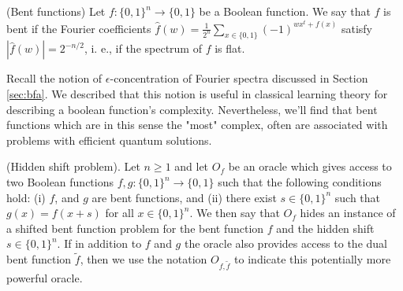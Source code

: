 \documentclass[main.tex]{subfiles}
\begin{document}
\begin{definition}(Bent functions) Let $f : \{0,1\}^n \rightarrow \{0, 1\}$ be a Boolean function. We say that $f$ is bent if the Fourier coefficients $\hat{f}(w) = \frac{1}{2^n}\sum_{x \in \{0, 1\}} (-1)^{wx^t + f(x)}$ satisfy $|\hat{f}(w)| = 2^{-n /2}$, i. e., if the spectrum of $f$ is flat.
\end{definition}

Recall the notion of $\epsilon$-concentration of Fourier spectra discussed in Section \ref{sec:bfa}. We described that this notion is useful in classical learning theory for describing a boolean function's complexity. Nevertheless, we'll find that bent functions which are in this sense the "most" complex, often are associated with problems with efficient quantum solutions.

\begin{definition}
(Hidden shift problem). Let $n \geq 1$ and let $O_f$ be an oracle which gives access to two Boolean functions $f, g : \{0, 1\}^n \rightarrow \{0, 1\}$ such that the following conditions hold: (i) $f$, and $g$ are bent functions, and (ii) there exist $s \in \{0, 1\}^n$ such that $g(x) = f(x + s)$ for all $x \in \{0, 1\}^n$. We then say that $O_f$ hides an instance of a shifted bent function problem for the bent function $f$ and the hidden shift $s \in \{0, 1\}^n$. If in addition to $f$ and $g$ the oracle also provides access to the dual bent function $\tilde{f}$, then we use the notation $O_{f,\tilde{f}}$ to indicate this potentially more powerful oracle.	
\end{definition}
\end{document}
